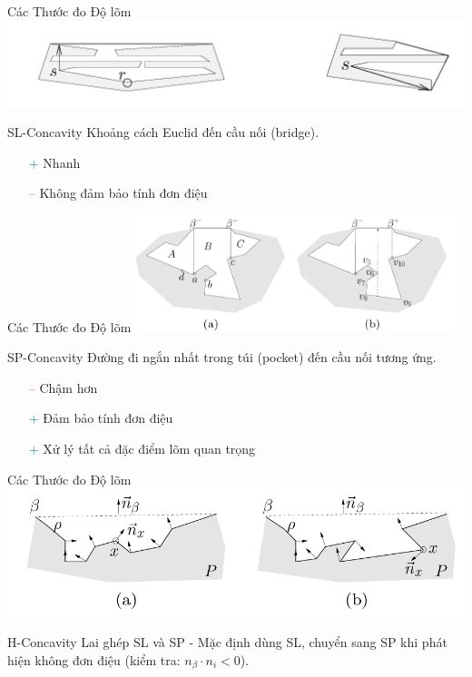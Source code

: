 \documentclass[aspectratio=169]{beamer}
\begin{document}
\begin{frame}{Các Thước đo Độ lõm}
    \centering
    \includegraphics[width=0.8\linewidth]{imgs/ACD-2.png}

    \begin{block}{SL-Concavity}
        Khoảng cách Euclid đến cầu nối (bridge).
        \begin{itemize}
            \item[\textcolor{teal}{+}] Nhanh
            \item[\textcolor{red}{--}] Không đảm bảo tính đơn điệu
        \end{itemize}
    \end{block}

\end{frame}

\begin{frame}{Các Thước đo Độ lõm}
    \centering
    \includegraphics[width=0.7\textwidth]{imgs/sp_concavity.png}

    \begin{block}{SP-Concavity}
        Đường đi ngắn nhất trong túi (pocket) đến cầu nối tương ứng.
        \begin{itemize}
            \item[\textcolor{red}{--}] Chậm hơn
            \item[\textcolor{teal}{+}] Đảm bảo tính đơn điệu
            \item[\textcolor{teal}{+}] Xử lý tất cả đặc điểm lõm quan trọng
        \end{itemize}
    \end{block}

\end{frame}

\begin{frame}{Các Thước đo Độ lõm}
    \centering
    \includegraphics[width=0.7\linewidth]{imgs/ACD-6.png}
    \begin{alertblock}{H-Concavity}
        Lai ghép SL và SP - Mặc định dùng SL, chuyển sang SP khi phát hiện không đơn điệu (kiểm tra: $n_\beta \cdot n_i < 0$).
    \end{alertblock}

\end{frame}
\end{document}
